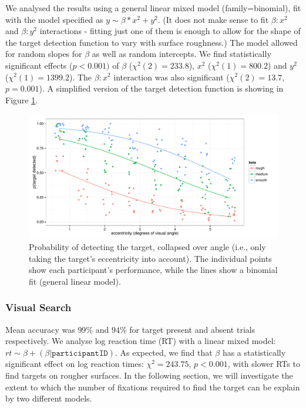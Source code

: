 \documentclass[preprint, authoryear]{elsarticle} %
\begin{document}
We analysed the results using a general linear mixed model (family=binomial), fit  with the model specified as $y\sim\beta*x^2 + y^2$. (It does not make sense to fit $\beta:x^2$ and $\beta:y^2$ interactions - fitting just one of them is enough to allow for the shape of the target detection function to vary with surface roughness.) The model allowed for random slopes for $\beta$ as well as random intercepts. We find statistically significant effects ($p<0.001)$ of $\beta$ ($\chi^2(2)=233.8$), $x^2$ ($\chi^2(1)=800.2$) and $y^2$ ($\chi^2(1)=1399.2$). The $\beta:x^2$ interaction was also significant ($\chi^2(2)=13.7$, $p=0.001$). A simplified version of the target detection function is showing in Figure \ref{fig:targDetEcc}.

\begin{figure}
	\centering
	\includegraphics[width=12cm]{fig/targDet/targDetModelEccOnly.pdf}
	\caption{Probability of detecting the target, collapsed over angle (i.e., only taking the target's eccentricity into account). The individual points show each participant's performance, while the lines show a binomial fit (general linear model).} 
	\label{fig:targDetEcc}
\end{figure}

\subsubsection{Visual Search}
\label{sec:visSearch}

Mean accuracy was $99\%$ and $94\%$ for target present and absent trials respectively. We analyse log reaction time (RT) with a linear mixed model: $rt \sim \beta +(\beta|\texttt{participantID})$. As expected, we find that $\beta$ has a statistically significant effect on log reaction times: $\chi^2=243.75$, $p<0.001$, with slower RTs to find targets on rougher surfaces. In the following section, we will investigate the extent to which the number of fixations required to find the target can be explain by two different models.
\end{document}
